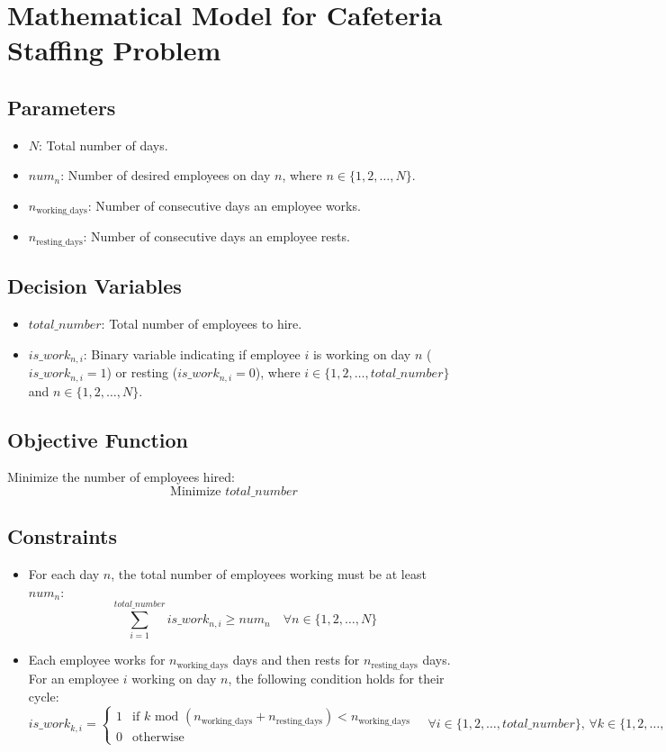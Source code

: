 \documentclass{article}
\begin{document}
\section*{Mathematical Model for Cafeteria Staffing Problem}

\subsection*{Parameters}
\begin{itemize}
    \item $N$: Total number of days.
    \item $num_n$: Number of desired employees on day $n$, where $n \in \{1, 2, \ldots, N\}$.
    \item $n_{\text{working\_days}}$: Number of consecutive days an employee works.
    \item $n_{\text{resting\_days}}$: Number of consecutive days an employee rests.
\end{itemize}

\subsection*{Decision Variables}
\begin{itemize}
    \item $total\_number$: Total number of employees to hire.
    \item $is\_work_{n,i}$: Binary variable indicating if employee $i$ is working on day $n$ ($is\_work_{n,i} = 1$) or resting ($is\_work_{n,i} = 0$), where $i \in \{1, 2, \ldots, total\_number\}$ and $n \in \{1, 2, \ldots, N\}$.
\end{itemize}

\subsection*{Objective Function}
Minimize the number of employees hired:
\[
\text{Minimize } total\_number
\]

\subsection*{Constraints}
\begin{itemize}
    \item For each day $n$, the total number of employees working must be at least $num_n$:
    \[
    \sum_{i=1}^{total\_number} is\_work_{n,i} \geq num_n \quad \forall n \in \{1, 2, \ldots, N\}
    \]
    
    \item Each employee works for $n_{\text{working\_days}}$ days and then rests for $n_{\text{resting\_days}}$ days. For an employee $i$ working on day $n$, the following condition holds for their cycle:
    \[
    is\_work_{k,i} = 
    \begin{cases} 
      1 & \text{if } k \text{ mod } (n_{\text{working\_days}} + n_{\text{resting\_days}}) < n_{\text{working\_days}} \\
      0 & \text{otherwise}
    \end{cases}
    \quad \forall i \in \{1, 2, \ldots, total\_number\}, \, \forall k \in \{1, 2, \ldots, N\}
    \]
\end{itemize}
\end{document}
